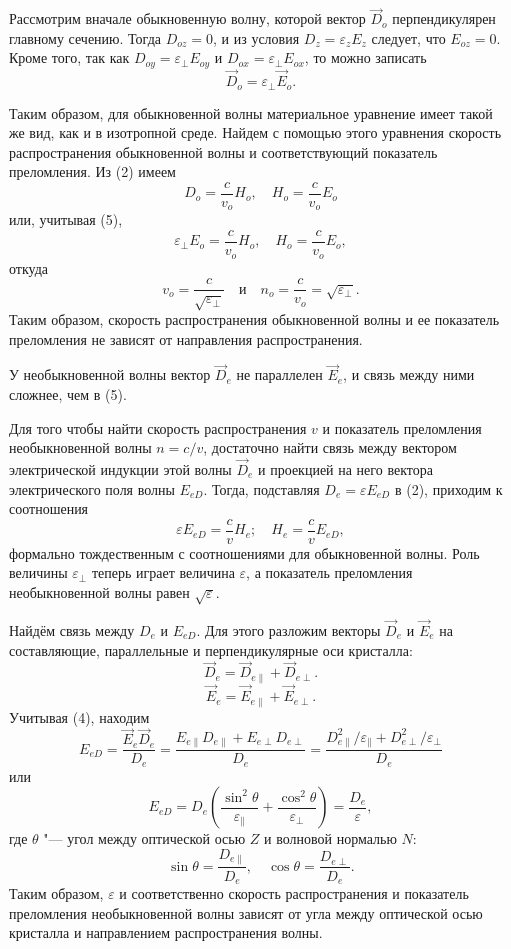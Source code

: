 \documentclass[a4paper, 12pt]{article}%
\begin{document}
	Рассмотрим вначале обыкновенную волну, которой вектор $\vec D_o$ перпендикулярен главному сечению. Тогда $D_{oz} = 0$, и из условия $D_z = \varepsilon_z E_z$ следует, что $E_{oz} = 0.$ Кроме того, так как $D_{oy} = \varepsilon_\perp E_{oy}$ и $D_{ox} = \varepsilon_\perp E_{ox}$, то можно записать 
	\begin{equation}
		\vec D_o = \varepsilon_\perp \vec E_o.
	\end{equation}
	
	Таким образом, для обыкновенной волны материальное уравнение имеет такой же вид, как и в изотропной среде. Найдем с помощью этого уравнения скорость распространения обыкновенной волны и соответствующий показатель преломления. Из (2) имеем
	\[
	D_o = \frac{c}{v_o} H_o, \quad H_o = \frac{c}{v_o} E_o
	\]
	или, учитывая (5),
	\[
	\varepsilon_{\perp} E_o = \frac{c}{v_o} H_o, \quad H_o = \frac{c}{v_o} E_o,
	\]
	откуда
	\[
	v_o = \frac{c}{ \sqrt{\varepsilon_{\perp}}} \quad \text{и} \quad n_o = \frac{c}{v_o} = \sqrt{\varepsilon_\perp}.
	\]
	Таким образом, скорость распространения обыкновенной волны и ее показатель преломления не зависят от направления распространения.
	
	У необыкновенной волны вектор $\vec D_e$ не параллелен $\vec E_e$, и связь между ними сложнее, чем в (5).
	
	Для того чтобы найти скорость распространения $v$ и показатель преломления необыкновенной волны $n = c / v$, достаточно найти связь между вектором электрической индукции этой волны $\vec D_e$ и проекцией на него вектора электрического поля волны $E_{eD}$. Тогда, подставляя $D_e = \varepsilon E_{eD}$ в (2), приходим к соотношения
	\[
	\varepsilon E_{eD} = \frac{c}{v} H_e; \quad H_e = \frac{c}{v} E_{eD},
	\]
	формально тождественным с соотношениями для обыкновенной волны. Роль величины $\varepsilon_\perp$ теперь играет величина $\varepsilon$, а показатель преломления необыкновенной волны равен $\sqrt{\varepsilon}$.
	
	Найдём связь между $D_e$ и $E_{eD}$. Для этого разложим векторы $\vec D_e$ и $\vec E_e$ на составляющие, параллельные и перпендикулярные оси кристалла:
	\[
	\vec D_e = \vec D_{e \parallel} + \vec D_{e \perp}.
	\]
	\[
	\vec E_e = \vec E_{e \parallel} + \vec E_{e \perp}.
	\]
	Учитывая (4), находим
	\[
	E_{eD} = \frac{\vec E_e \vec D_e}{D_e} = \frac{E_{e \parallel} D_{e \parallel} + E_{e \perp} D_{e \perp}}{D_e} = \frac{D^2_{e \parallel} / \varepsilon_\parallel + D^2_{e \perp} / \varepsilon_\perp}{D_e}
	\]
	или 
	\[
	E_{eD} = D_e \left( \frac{\sin^2{\theta}}{\varepsilon_\parallel} + \frac{\cos^2{\theta}}{\varepsilon_\perp} \right) = \frac{D_e}{\varepsilon},
	\]
	где $\theta$ "--- угол между оптической осью $Z$ и волновой нормалью $N$:
	\begin{equation}
		\sin \theta = \frac{D_{e \parallel}}{D_e}, \quad \cos \theta = \frac{D_{e \perp}}{D_e}.
	\end{equation}
	Таким образом, $\varepsilon$ и соответственно скорость распространения и показатель преломления необыкновенной волны зависят от угла между оптической осью кристалла и   направлением распространения волны.
	
\end{document}
